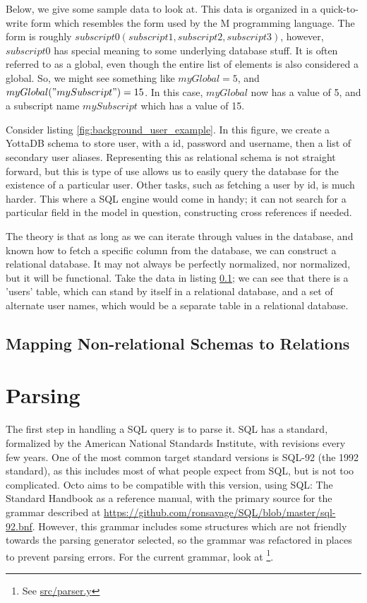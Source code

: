 \documentclass[]{article}
\newcommand{\gitlab}[1]{\footnote{See \href{https://gitlab.com/YottaDB/DBMS/YDBOcto/blob/master/#1}{#1}}}
\begin{document}
Below, we give some sample data to look at.
This data is organized in a quick-to-write form which resembles the form used by the M programming language.
The form is roughly $subscript0(subscript1,subscript2,subscript3)$, however, $subscript0$ has special meaning to some underlying database stuff.
It is often referred to as a global, even though the entire list of elements is also considered a global.
So, we might see something like $myGlobal=5$, and $myGlobal("mySubscript")=15$.
In this case, $myGlobal$ now has a value of 5, and a subscript name $mySubscript$ which has a value of 15.

Consider listing \ref{fig:background_user_example}.
In this figure, we create a YottaDB schema to store user, with a id, password and username, then a list of secondary user aliases.
Representing this as relational schema is not straight forward, but this is type of use allows us to easily query the database for the existence of a particular user.
Other tasks, such as fetching a user by id, is much harder.
This where a SQL engine would come in handy; it can not search for a particular field in the model in question, constructing cross references if needed.



The theory is that as long as we can iterate through values in the database, and known how to fetch a specific column from the database, we can construct a relational database.
It may not always be perfectly normalized, nor normalized, but it will be functional.
Take the data in listing \ref{sec:background_mapping}; we can see that there is a 'users' table, which can stand by itself in a relational database, and a set of alternate user names, which would be a separate table in a relational database.


\subsection{Mapping Non-relational Schemas to Relations} \label{sec:background_mapping}

\section{Parsing} \label{sec:parsing}

The first step in handling a SQL query is to parse it.
SQL has a standard, formalized by the American National Standards Institute, with revisions every few years.
One of the most common target standard versions is SQL-92 (the 1992 standard), as this includes most of what people expect from SQL, but is not too complicated.
Octo aims to be compatible with this version, using SQL: The Standard Handbook \cite{cannan1993sql} as a reference manual, with the primary source for the grammar described at \url{https://github.com/ronsavage/SQL/blob/master/sql-92.bnf}\cite{ronsavage2003sql}.
However, this grammar includes some structures which are not friendly towards the parsing generator selected, so the grammar was refactored in places to prevent parsing errors.
For the current grammar, look at \gitlab{src/parser.y}.
\end{document}
